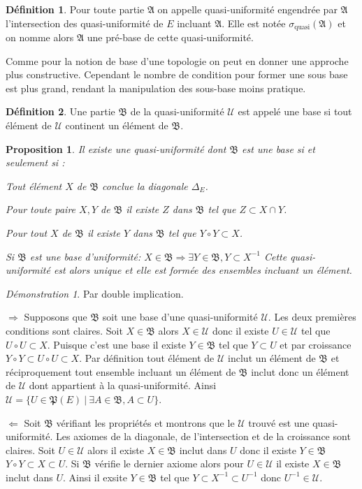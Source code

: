 \documentclass[a4paper, 11pt, french]{book}
\newenvironment{itemise}{\itemize}{\enditemize}
\theoremstyle{plain} %
\newtheorem{proposition}{Proposition}
\theoremstyle{definition} %
\newtheorem{definition}{Définition}
\theoremstyle{remark} %
\newtheorem*{demonstration}{Démonstration}
\newcommand{\1}{\mathds{1}}
\newcommand{\inv}[1]{#1^{-1}}
\renewcommand{\frak}[1]{\mathfrak{#1}}
\newcommand{\scr}[1]{\mathscr{#1}}
\newcommand\ens[2]{\{#1 \ |\ #2\}}
\newcommand\equivalence[3]{
	\begin{demonstration}
		#1
		\begin{itemise}
			\item[$\Longrightarrow$] #2
			\item[$\Longleftarrow$] #3
		\end{itemise}
	\end{demonstration}
}
\begin{document}
\begin{definition}
	Pour toute partie $\frak{A}$ on appelle quasi-uniformité engendrée par $\frak{A}$ l'intersection des quasi-uniformité de $E$ incluant $\frak{A}$.
	Elle est notée $\sigma_\text{quasi}(\frak{A})$ et on nomme alors $\frak{A}$ une pré-base de cette quasi-uniformité.
\end{definition}

Comme pour la notion de base d'une topologie on peut en donner une approche plus constructive.
Cependant le nombre de condition pour former une sous base est plus grand, rendant la manipulation des sous-base moins pratique.

\begin{definition}
	Une partie $\frak{B}$ de la quasi-uniformité $\scr{U}$ est appelé une base si tout élément de $\scr{U}$ continent un élément de $\frak{B}$.
\end{definition}

\begin{proposition}
	Il existe une quasi-uniformité dont $\frak{B}$ est une base si et seulement si :
	\begin{itemise}
		\item Tout élément $X$ de $\frak{B}$ conclue la diagonale $\Delta_E$.
		\item Pour toute paire $X, Y$ de $\frak{B}$ il existe $Z$ dans $\frak{B}$ tel que $Z\subset X\cap Y$.
		\item Pour tout $X$ de $\frak{B}$ il existe $Y$ dans $\frak{B}$ tel que $Y\circ Y\subset X$.
		\item Si $\frak{B}$ est une base d'uniformité: $X\in\frak{B}\Rightarrow\exists Y\in\frak{B}, Y\subset X^{-1}$
	\end{itemise}
	Cette quasi-uniformité est alors unique et elle est formée des ensembles incluant un élément.%
\end{proposition}

\equivalence{Par double implication.}{
	Supposons que $\frak{B}$ soit une base d'une quasi-uniformité $\scr{U}$.
	Les deux premières conditions sont claires.
	Soit $X\in\frak{B}$ alors $X\in\scr{U}$ donc il existe $U\in\scr{U}$ tel que $U\circ U\subset X$.
	Puisque c'est une base il existe $Y\in\frak{B}$ tel que $Y\subset U$ et par croissance $Y\circ Y\subset U\circ U\subset X$.
	Par définition tout élément de $\scr{U}$ inclut un élément de $\frak{B}$ et réciproquement tout ensemble incluant un élément de $\frak{B}$ inclut donc un élément de $\scr{U}$ dont appartient à la quasi-uniformité.
	Ainsi $\scr{U}=\ens{U\in\frak{P}(E)}{\exists A\in\frak{B}, A\subset U}$.
}{
	Soit $\frak{B}$ vérifiant les propriétés et montrons que le $\scr{U}$ trouvé est une quasi-uniformité.
	Les axiomes de la diagonale, de l'intersection et de la croissance sont claires.
	Soit $U\in\scr{U}$ alors il existe $X\in\frak{B}$ inclut dans $U$ donc il existe $Y\in\frak{B}$ $Y\circ Y\subset X\subset U$.
	Si $\frak{B}$ vérifie le dernier axiome alors pour $U\in\scr{U}$ il existe $X\in\frak{B}$ inclut dans $U$.
	Ainsi il exsite $Y\in\frak{B}$ tel que $Y\subset X^{-1}\subset\inv{U}$ donc $\inv{U}\in\scr{U}$.
}
\end{document}
